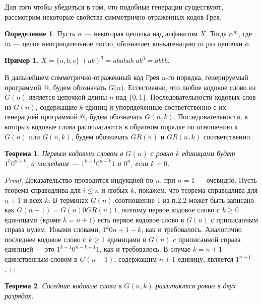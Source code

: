 \documentclass[12pt,a4paper]{article}
\theoremstyle{plain}
\newtheorem{theorem}{Теорема}
\theoremstyle{definition}
\newtheorem{definition}{Определение}
\newtheorem*{example}{Пример}
\theoremstyle{remark}
\begin{document}
Для того чтобы убедиться в том, что подобные генерации существуют, рассмотрим некоторые свойства симметрично-отраженных кодов Грея. 

\begin{definition}
Пусть $\alpha$ --- некоторая цепочка над алфавитом $X$. Тогда $\alpha^m$, где $m$ --- целое неотрицательное число, обозначает конкатенацию $m$ раз цепочки $\alpha$.
\end{definition}

\begin{example}
$X=\{a,b,c\}$ $(ab)^3=ababab$ $ab^3=abbb$.
\end{example}

В дальнейшем симметрично-отраженный код Грея $n$-го порядка, генерируемый программой @, будем обозначать $G(n$). Естественно, что любое кодовое слово из $G(n)$ является цепочкой длины $n$ над $\{0,1\}$. Последовательности кодовых слов из $G(n)$, содержащие $k$ единиц и упорядоченные соответственно с их генерацией программой @, будем обозначать $G(n,k)$. Последовательности, в которых кодовые слова располагаются в обратном порядке по отношению к $G(n)$ или $G(n,k)$, будем обозначать $GR(n)$ и $GR(n,k)$ соответственно. 

\begin{theorem}
\label{thm:4.1}
Первым кодовым словом в $G(n)$ с ровно $k$ единицами будет $1^k0^{n-k}$, а последним --- $1^{k-1}0^{n-k}1$ и $0^n$, если $k=0$.
\end{theorem}

\begin{proof}
Доказательство проводится индукцией по $n$, при $n=1$ --- очевидно. Пусть теорема справедлива для $i\le n$ и любых $k$, покажем, что теорема справедлива для $n+1$ и всех $k$. В терминах $G(n)$ соотношение {1} из п.2.2 может быть записано как $G(n+1)=G(n)0GR(n)1$, поэтому первое кодовое слово с $k\ge 0$ единицами (кроме $k=n+1$) есть первое кодовое слово в $G(n)$ с приписанным справа нулем. Иными словами, $1^k0{n+1-k}$, как и требовалось. Аналогично последнее кодовое слово с $k\ge 1$ единицами в $G(n)$ c приписанной справа единицей --- это $1^{k-1}0^{n-k+1}1$, как и требовалось. В случае $k=n+1$ единственным словом в $G(n+1)$, содержащим $n+1$ единицу, является $1^{n+1}$.
\end{proof}

\begin{theorem}
Соседние кодовые слова в $G(n,k)$ различаются ровно в двух разрядах.
\end{theorem}
\end{document}
